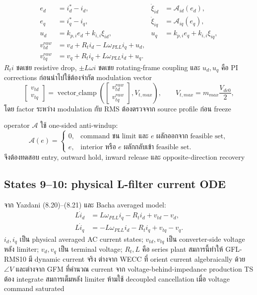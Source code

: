 \documentclass[12pt,a4paper]{article}
\begin{document}
\begin{align}
e_d&=i_d^*-i_d,&\dot\xi_{id}&=\mathcal A_{id}(e_d),\\
e_q&=i_q^*-i_q,&\dot\xi_{iq}&=\mathcal A_{iq}(e_q),\\
u_d&=k_{p,i}e_d+k_{i,i}\xi_{id},&
u_q&=k_{p,i}e_q+k_{i,i}\xi_{iq},\\
v_{td}^{raw}&=v_d+R_ti_d-L\omega_{PLL}i_q+u_d,\\
v_{tq}^{raw}&=v_q+R_ti_q+L\omega_{PLL}i_d+u_q.
\label{eq:gfl10-current-controller}
\end{align}
$R_ti$ ชดเชย resistive drop, $\pm L\omega i$ ชดเชย rotating-frame coupling
และ $u_d,u_q$ คือ PI corrections ก่อนนำไปใช้ต้องจำกัด modulation vector
\begin{equation}
\begin{bmatrix}v_{td}\\v_{tq}\end{bmatrix}
=\operatorname{vector\_clamp}
\left(\begin{bmatrix}v_{td}^{raw}\\v_{tq}^{raw}\end{bmatrix},V_{t,max}\right),
\qquad V_{t,max}=m_{max}\frac{V_{dc0}}{2},
\label{eq:gfl10-vlimit}
\end{equation}
โดย factor ระหว่าง modulation กับ RMS ต้องตรวจจาก source profile ก่อน freeze

operator $\mathcal A$ ใช้ one-sided anti-windup:
\begin{equation}
\mathcal A(e)=\begin{cases}
0,&\text{command ชน limit และ }e\text{ ผลักออกจาก feasible set},\\
e,&\text{interior หรือ }e\text{ ผลักกลับเข้า feasible set}.
\end{cases}
\label{eq:gfl10-aw}
\end{equation}
จึงต้องทดสอบ entry, outward hold, inward release และ opposite-direction recovery

\subsection{States 9--10: physical L-filter current ODE}

จาก Yazdani (8.20)--(8.21) และ Bacha averaged model:
\begin{align}
L\dot i_d&=L\omega_{PLL}i_q-R_ti_d+v_{td}-v_d,\\
L\dot i_q&=-L\omega_{PLL}i_d-R_ti_q+v_{tq}-v_q.
\label{eq:gfl10-current-ode}
\end{align}
$i_d,i_q$ เป็น physical averaged AC current states; $v_{td},v_{tq}$ เป็น converter-side
voltage หลัง limiter; $v_d,v_q$ เป็น terminal voltage; $R_t,L$ คือ series plant
สมการนี้ทำให้ GFL-RMS10 มี dynamic current จริง ต่างจาก WECC ที่ orient current
algebraically ด้วย $\angle V$ และต่างจาก GFM ที่คำนวณ current จาก voltage-behind-impedance
production TS ต้อง integrate สมการเต็มหลัง limiter ห้ามใช้ decoupled cancellation
เมื่อ voltage command saturated
\end{document}

